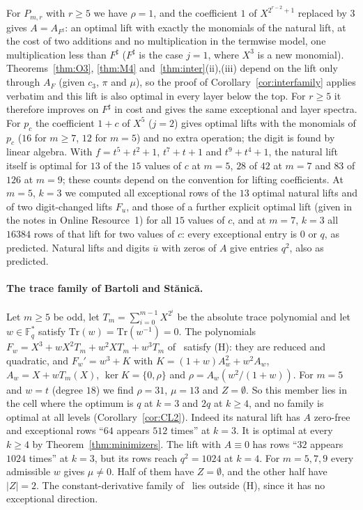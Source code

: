 \documentclass[11pt]{article}
\theoremstyle{definition}
\theoremstyle{remark}
\newcommand{\F}{\mathbb{F}}
\newcommand{\Tr}{\mathrm{Tr}}
\newcommand{\ol}[1]{\overline{#1}}
\begin{document}
For $P_{m,r}$ with $r\ge5$ we have $\rho=1$, and the coefficient $1$ of $X^{2^{r-2}+1}$ replaced by $3$ gives
$A=A_{F^\sharp}$: an optimal lift with exactly the monomials of the natural lift, at the cost of two additions and no
multiplication in the termwise model, one multiplication less than $F^\sharp$ ($F^\sharp$ is the case $j=1$, where $X^3$ is
a new monomial). Theorems~\ref{thm:O3}, \ref{thm:M4} and~\ref{thm:inter}(ii),(iii) depend on the lift only through $A_F$ (given
$c_3$, $\pi$ and $\mu$), so the proof of Corollary~\ref{cor:interfamily} applies verbatim and this lift is also optimal
in every layer below the top.
For $r\ge5$ it therefore improves on $F^\sharp$ in cost and gives the same exceptional and layer spectra. For $p_c$ the
coefficient $1+c$ of $X^5$ ($j=2$) gives optimal lifts with the monomials of $p_c$ ($16$ for $m\ge7$, $12$ for $m=5$) and
no extra operation; the digit is found by linear algebra. With $f=t^5+t^2+1$, $t^7+t+1$ and $t^9+t^4+1$, the natural lift itself is optimal for $13$ of the $15$
values of $c$ at $m=5$, $28$ of $42$ at $m=7$ and $83$ of $126$ at $m=9$; these counts depend on the convention for
lifting coefficients. At $m=5$, $k=3$ we computed all exceptional rows of the $13$ optimal natural lifts and of two
digit-changed lifts $F_u$, and those of a further explicit optimal lift (given in the notes in Online Resource~1) for all
$15$ values of $c$, and at $m=7$, $k=3$ all $16384$ rows of that lift for two values of $c$: every exceptional entry is
$0$ or $q$, as predicted. Natural lifts and digits $\ol u$ with zeros of $A$ give entries $q^2$, also as predicted.

\paragraph{The trace family of Bartoli and Stănică.}
Let $m\ge5$ be odd, let $T_m=\sum_{i=0}^{m-1}X^{2^i}$ be the absolute trace polynomial and let $w\in\F_q^*$ satisfy
$\Tr(w)=\Tr(w^{-1})=0$. The polynomials $F_w=X^3+wX^2T_m+w^2XT_m+w^3T_m$ of~\cite[Thm.~2.4]{BS} satisfy (H): they are
reduced and quadratic, and
$F_w'=w^3+K$ with $K=(1+w)A_w^2+w^2A_w$, $A_w=X+wT_m(X)$, $\ker K=\{0,\rho\}$ and $\rho=A_w(w^2/(1+w))$. For $m=5$ and
$w=t$ (degree $18$) we find $\rho=31$, $\mu=13$ and $Z=\emptyset$. So this member lies in the cell where the optimum
is $q$ at $k=3$ and $2q$ at $k\ge4$, and no family is optimal at all levels (Corollary~\ref{cor:CL2}). Indeed
its natural lift has $A$ zero-free and exceptional rows ``$64$ appears $512$ times'' at $k=3$. It is optimal at
every $k\ge4$ by Theorem~\ref{thm:minimizers}. The lift with $A\equiv0$ has rows ``$32$ appears $1024$ times''
at $k=3$, but its rows reach $q^2=1024$ at $k=4$. For $m=5,7,9$ every admissible $w$ gives $\mu\ne0$. Half of
them have $Z=\emptyset$, and the other half have $|Z|=2$. The constant-derivative family
of~\cite[Thm.~2.3]{BS} lies outside (H), since it has no exceptional direction.
\end{document}
